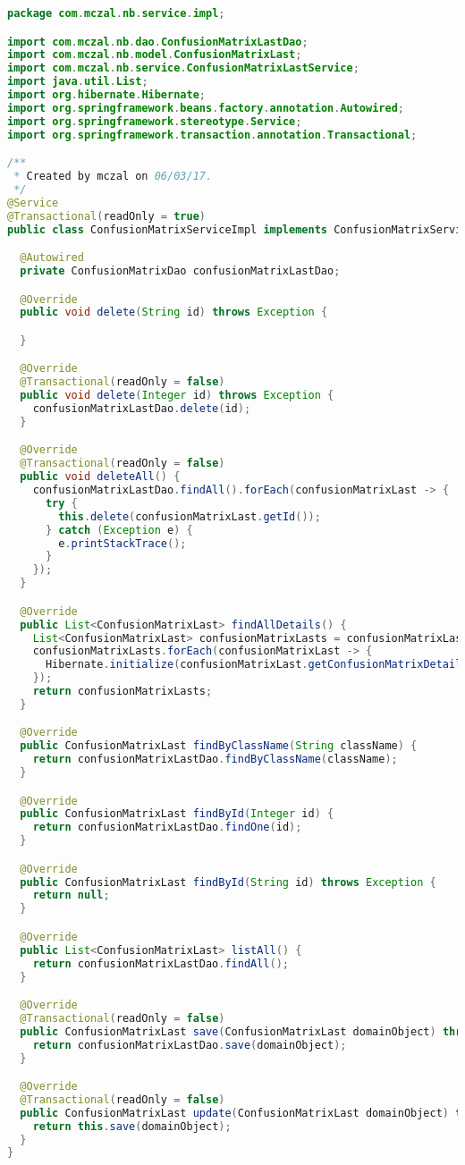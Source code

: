 \begin{lstlisting}[language=Java,basicstyle=\tiny,caption=ConfusionMatrixServiceImpl.java]
package com.mczal.nb.service.impl;

import com.mczal.nb.dao.ConfusionMatrixLastDao;
import com.mczal.nb.model.ConfusionMatrixLast;
import com.mczal.nb.service.ConfusionMatrixLastService;
import java.util.List;
import org.hibernate.Hibernate;
import org.springframework.beans.factory.annotation.Autowired;
import org.springframework.stereotype.Service;
import org.springframework.transaction.annotation.Transactional;

/**
 * Created by mczal on 06/03/17.
 */
@Service
@Transactional(readOnly = true)
public class ConfusionMatrixServiceImpl implements ConfusionMatrixService {

  @Autowired
  private ConfusionMatrixDao confusionMatrixLastDao;

  @Override
  public void delete(String id) throws Exception {

  }

  @Override
  @Transactional(readOnly = false)
  public void delete(Integer id) throws Exception {
    confusionMatrixLastDao.delete(id);
  }

  @Override
  @Transactional(readOnly = false)
  public void deleteAll() {
    confusionMatrixLastDao.findAll().forEach(confusionMatrixLast -> {
      try {
        this.delete(confusionMatrixLast.getId());
      } catch (Exception e) {
        e.printStackTrace();
      }
    });
  }

  @Override
  public List<ConfusionMatrixLast> findAllDetails() {
    List<ConfusionMatrixLast> confusionMatrixLasts = confusionMatrixLastDao.findAll();
    confusionMatrixLasts.forEach(confusionMatrixLast -> {
      Hibernate.initialize(confusionMatrixLast.getConfusionMatrixDetails());
    });
    return confusionMatrixLasts;
  }

  @Override
  public ConfusionMatrixLast findByClassName(String className) {
    return confusionMatrixLastDao.findByClassName(className);
  }

  @Override
  public ConfusionMatrixLast findById(Integer id) {
    return confusionMatrixLastDao.findOne(id);
  }

  @Override
  public ConfusionMatrixLast findById(String id) throws Exception {
    return null;
  }

  @Override
  public List<ConfusionMatrixLast> listAll() {
    return confusionMatrixLastDao.findAll();
  }

  @Override
  @Transactional(readOnly = false)
  public ConfusionMatrixLast save(ConfusionMatrixLast domainObject) throws Exception {
    return confusionMatrixLastDao.save(domainObject);
  }

  @Override
  @Transactional(readOnly = false)
  public ConfusionMatrixLast update(ConfusionMatrixLast domainObject) throws Exception {
    return this.save(domainObject);
  }
}

\end{lstlisting}


